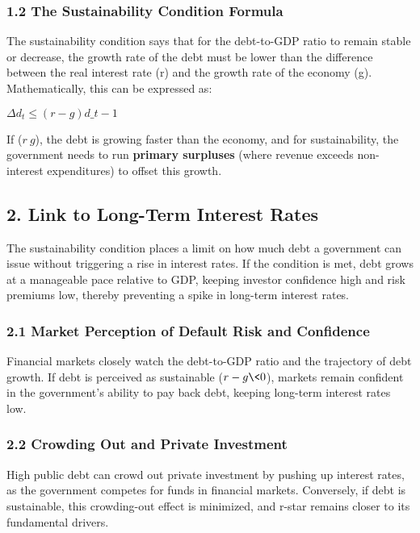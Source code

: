 \documentclass[
  letterpaper,
  DIV=11,
  numbers=noendperiod]{scrartcl}
\begin{document}
\subsubsection{1.2 The Sustainability Condition
Formula}\label{the-sustainability-condition-formula}

The sustainability condition says that for the debt-to-GDP ratio to
remain stable or decrease, the growth rate of the debt must be lower
than the difference between the real interest rate (r) and the growth
rate of the economy (g). Mathematically, this can be expressed as:

\(\Delta d_t \leq (r - g) d\_{t-1}\)

If (\(r \> g\)), the debt is growing faster than the economy, and for
sustainability, the government needs to run \textbf{primary surpluses}
(where revenue exceeds non-interest expenditures) to offset this growth.

\subsection{2. Link to Long-Term Interest
Rates}\label{link-to-long-term-interest-rates}

The sustainability condition places a limit on how much debt a
government can issue without triggering a rise in interest rates. If the
condition is met, debt grows at a manageable pace relative to GDP,
keeping investor confidence high and risk premiums low, thereby
preventing a spike in long-term interest rates.

\subsubsection{2.1 Market Perception of Default Risk and
Confidence}\label{market-perception-of-default-risk-and-confidence}

Financial markets closely watch the debt-to-GDP ratio and the trajectory
of debt growth. If debt is perceived as sustainable (\(r - g \< 0\)),
markets remain confident in the government's ability to pay back debt,
keeping long-term interest rates low.

\subsubsection{2.2 Crowding Out and Private
Investment}\label{crowding-out-and-private-investment}

High public debt can crowd out private investment by pushing up interest
rates, as the government competes for funds in financial markets.
Conversely, if debt is sustainable, this crowding-out effect is
minimized, and r-star remains closer to its fundamental drivers.
\end{document}
